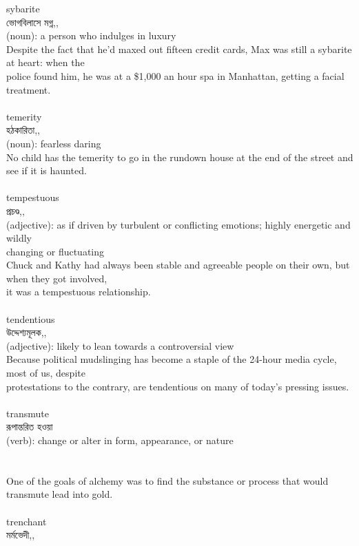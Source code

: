 \documentclass{article}
\begin{document}
{{sybarite}\\
{ভোগবিলাসে মগ্ন,,}\\
{(noun): a person who indulges in luxury\\Despite the fact that he'd maxed out fifteen credit cards, Max was still a sybarite at heart: when the\\police found him, he was at a \$1,000 an hour spa in Manhattan, getting a facial treatment.\\}\\
{temerity}\\
{হঠকারিতা,,}\\
{(noun): fearless daring\\No child has the temerity to go in the rundown house at the end of the street and see if it is haunted.\\}\\
{tempestuous}\\
{প্রচণ্ড,,}\\
{(adjective): as if driven by turbulent or conflicting emotions; highly energetic and wildly\\changing or fluctuating\\Chuck and Kathy had always been stable and agreeable people on their own, but when they got involved,\\it was a tempestuous relationship.\\}\\
{tendentious}\\
{উদ্দেশ্যমূলক,,}\\
{(adjective): likely to lean towards a controversial view\\Because political mudslinging has become a staple of the 24-hour media cycle, most of us, despite\\protestations to the contrary, are tendentious on many of today's pressing issues.\\}\\
{transmute}\\
{রূপান্তরিত হওয়া}\\
{(verb): change or alter in form, appearance, or nature\\\\                                                                                \\One of the goals of alchemy was to find the substance or process that would transmute lead into gold.\\}\\
{trenchant}\\
{মর্মভেদী,,}\\
}
\end{document}
